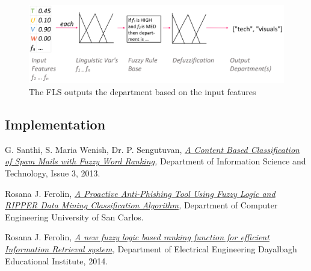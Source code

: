 \documentclass[a4paper]{article}
\begin{document}
\begin{enumerate}
    \begin{figure}[ht!]
        \centering
        \includegraphics[width=.9\linewidth]{res/classifying}
        \caption{The FLS outputs the department based on the input features}
        \label{fig:sub1}
    \end{figure}

\end{enumerate}


\subsection{Implementation}

%
%
\begin{thebibliography}{9}

    G. Santhi, S. Maria Wenish, Dr. P. Sengutuvan,
    \textit{
        \href{https://github.com/Menziess/Fuzzy-Logic-Email-Classification/raw/master/report/res/a_content_based_classification_of_spam_mails_with_fuzzy_word_ranking.pdf}{A Content Based Classification of Spam Mails with Fuzzy Word Ranking},
    }
    Department of Information Science and Technology,
    Issue 3,
    2013.

    Rosana J. Ferolin,
    \textit{
        \href{https://github.com/Menziess/Fuzzy-Logic-Email-Classification/raw/master/report/res/a_proactive_anti-phishing_tool_using_fuzzy_logic_and_ripper_data_mining_classification_algorithm.pdf}{A Proactive Anti-Phishing Tool Using Fuzzy Logic and RIPPER Data Mining Classification Algorithm},
    }
    Department of Computer Engineering University of San Carlos.

    Rosana J. Ferolin,
    \textit{
        \href{https://github.com/Menziess/Fuzzy-Logic-Email-Classification/raw/master/report/res/a_new_fuzzy_logic_based_ranking_function_for_efficient_information_retrieval_system.pdf}{A new fuzzy logic based ranking function for efficient Information Retrieval system},
    }
    Department of Electrical Engineering Dayalbagh Educational Institute,
    2014.

\end{thebibliography}
\end{document}
